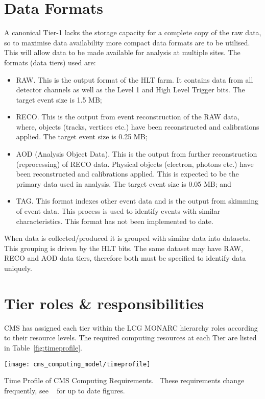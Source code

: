 \section{Data Formats}
A canonical Tier-1 lacks the storage capacity for a complete copy of the raw data, so to maximise data availability more compact data formats are to be utilised. This will allow data to be made available for analysis at multiple sites. The formats (data tiers) used are:
\begin{itemize}
\item RAW. This is the output format of the HLT farm. It contains data from all detector channels as well as the Level 1 and High Level Trigger bits. The target event size is 1.5 MB;
\item RECO. This is the output from event reconstruction of the RAW data, where, objects (tracks, vertices etc.) have been reconstructed and calibrations applied. The target event size is 0.25 MB;
\item AOD (Analysis Object Data). This is the output from further reconstruction (reprocessing) of RECO data. Physical objects (electron, photons etc.) have been reconstructed and calibrations applied. This is expected to be the primary data used in analysis. The target event size is 0.05 MB; and
\item TAG. This format indexes other event data and is the output from skimming of event data. This process is used to identify events with similar characteristics. This format has not been implemented to date.
\end{itemize}
When data is collected/produced it is grouped with similar data into datasets. This grouping is driven by the HLT bits. The same dataset may have RAW, RECO and AOD data tiers, therefore both must be specified to identify data uniquely.

\section{Tier roles \& responsibilities}
CMS has assigned each tier within the LCG MONARC hierarchy roles according to their resource levels. The required computing resources at each Tier are listed in Table~\ref{fig:timeprofile}. 

\begin{table}[tbp]
  \centering
  \texttt{[image: cms\_computing\_model/timeprofile]}
  \caption{Time Profile of CMS Computing Requirements.~\cite{CMS_TDR_PHYS_vol1} These requirements change frequently, see ~\cite{revised_resources} for up to date figures.
  \label{fig:timeprofile}}
\end{table}

